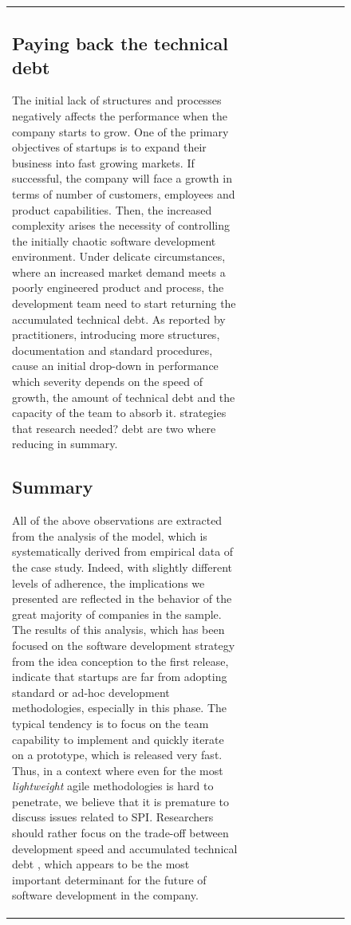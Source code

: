 \documentclass[12pt,journal,compsoc]{../sty/IEEEtran}
\begin{document}
\begin{table}[!t]
\begin{figure}[!t]
\begin{compactitem}
\begin{table}[!t]
\begin{tabular}{|l||c||c||c||c||c||c||c||c||c|}
\subsection{Paying back the technical debt} The initial lack of structures and
processes negatively affects the  performance when the company starts to grow.
One of the primary objectives of  startups is to expand their business into fast
growing markets. If  successful, the company will face a growth in terms of
number of customers,  employees and product capabilities. Then, the increased
complexity arises the  necessity of controlling the initially chaotic software
development environment.  Under delicate circumstances, where an increased
market demand meets a poorly  engineered product and process, the development
team need to start returning  the accumulated technical debt. As reported by
practitioners, introducing more  structures, documentation and standard
procedures, cause an initial drop-down in  performance which severity depends on
the speed of growth, the amount of  technical debt and the capacity of the team
to absorb it.  %
strategies that  %
research needed?  %
debt are two  %
where  %
reducing  %
in summary.



\subsection{Summary} All of the above observations are extracted from the
analysis of the model,  which is systematically derived from empirical data of
the case study. Indeed,  with slightly different levels of adherence, the
implications we presented are  reflected in the behavior of the great majority
of companies in the sample. The  results of this analysis, which has been
focused on the software development  strategy from the idea conception to the
first release, indicate that startups  are far from adopting standard or ad-hoc
development methodologies, especially  in this phase. The typical tendency is to
focus on the team capability to  implement and quickly iterate on a prototype,
which is released very fast. Thus,  in a context where even for the most
\textit{lightweight} agile methodologies is  hard to penetrate, we believe that
it is premature to discuss issues related to  SPI. Researchers should rather
focus on the trade-off between development speed  and accumulated technical debt
\cite{Brown:2010:MTD:1882362.1882373}, which  appears to be the most important
determinant for the future of  software development in the company.


\end{tabular}
\end{table}
\end{compactitem}
\end{figure}
\end{table}
\end{document}
